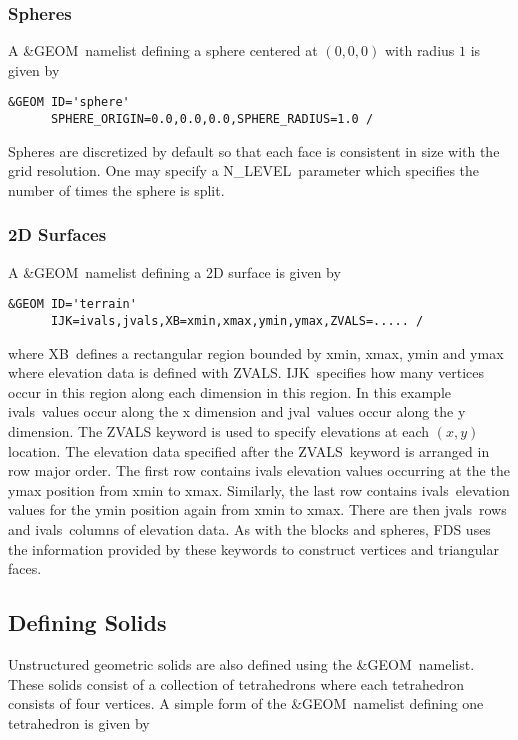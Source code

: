 \documentclass[12pt]{article}
\begin{document}
\subsubsection{Spheres}
A {\ct \&GEOM}\ namelist defining a sphere centered at $(0,0,0)$ with radius $1$ is given by

\begin{verbatim}
&GEOM ID='sphere'
      SPHERE_ORIGIN=0.0,0.0,0.0,SPHERE_RADIUS=1.0 /
\end{verbatim}

\noindent Spheres are discretized by default so that each face is consistent in size with the grid resolution.
One may specify a {\ct N\_LEVEL}\ parameter which specifies the number of times the sphere is split.

\subsubsection{2D Surfaces}
A {\ct \&GEOM}\ namelist defining a 2D surface is given by

\begin{verbatim}
&GEOM ID='terrain'
      IJK=ivals,jvals,XB=xmin,xmax,ymin,ymax,ZVALS=..... /
\end{verbatim}

\noindent where {\ct XB}\ defines a rectangular region bounded by xmin, xmax, ymin and ymax where elevation data is defined with {\ct ZVALS}.
{\ct IJK}\ specifies how many vertices occur in this region along each dimension in this region.
In this example {\ct ivals}\ values occur along the x dimension and {\ct jval}\ values occur along the y dimension.
The {\ct ZVALS} keyword is used to specify elevations at each $(x,y)$ location.
The elevation data specified after the {\ct ZVALS}\ keyword is arranged in row major order.
The first row contains {\ct ivals} elevation values occurring at the the ymax position from xmin to xmax.
Similarly, the last row contains
{\ct ivals}\ elevation values for the ymin position again from xmin to xmax.
There are then {\ct jvals}\ rows and {\ct ivals}\ columns of elevation data.
As with the blocks and spheres, FDS uses the information
provided by these keywords to construct
vertices and triangular faces.

\subsection{Defining Solids}
Unstructured geometric solids are also defined using the {\ct \&GEOM}\ namelist.
These solids consist of a collection of tetrahedrons where each tetrahedron consists of four vertices.
A simple form of the {\ct \&GEOM}\ namelist defining one tetrahedron is given by
\end{document}
